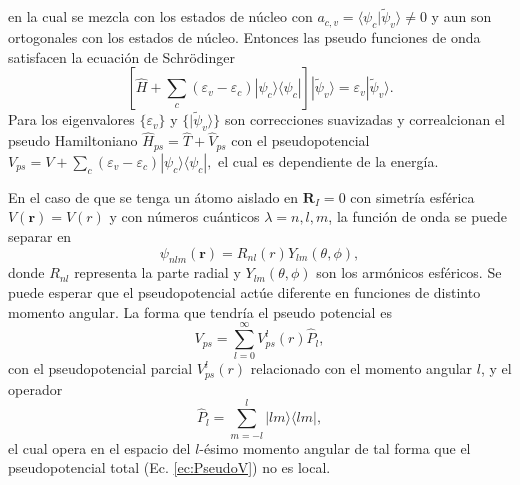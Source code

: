    en la cual se mezcla con los estados de n\'ucleo con $a_{c,v} = \langle \psi_c | \tilde{\psi}_v \rangle \not = 0$ y aun son ortogonales con los estados de n\'ucleo. Entonces las pseudo funciones de onda satisfacen la ecuaci\'on de  Schr\"odinger \cite{PhysRev.57.1169}
   \begin{equation}
   \left[\hat{H} + \sum_{c} (\varepsilon_v - \varepsilon_c) |\psi_c \rangle \langle \psi_c |\right] |\tilde{\psi}_v \rangle = \varepsilon_v | \tilde{\psi}_v \rangle .
   \end{equation}
   Para los eigenvalores $\{ \varepsilon_v \}$ y $ \{| \tilde{\psi}_v \rangle \}$ son correcciones suavizadas y correalcionan el pseudo Hamiltoniano $\hat{H}_{ps} = \hat{T} + \hat{V}_{ps}$ con el pseudopotencial
   $
   V_{ps}= V+ \sum_{c} (\varepsilon_v - \varepsilon_c) |\psi_c \rangle \langle \psi_c |,
   $
   el cual es dependiente de la energ\'ia.
   \newline
   \par En el caso de que se tenga un \'atomo aislado en $\pmb{R}_I = 0$ con simetr\'ia esf\'erica $V(\pmb{r}) = V(r)$ y con n\'umeros cu\'anticos $\lambda= n,l,m $, la funci\'on de onda se puede separar en \cite{MB-2015}
   \begin{equation}
   \psi_{nlm} (\pmb{r}) = R_{nl} (r) Y_{lm} (\theta, \phi) \label{ec:Psudofunc},
   \end{equation}
   donde $R_{nl}$ representa la parte radial y $Y_{lm} (\theta, \phi) $ son los  arm\'onicos esf\'ericos. Se puede esperar que el pseudopotencial act\'ue diferente en funciones de distinto momento angular.  La forma que tendr\'ia el pseudo potencial es \cite{PhysRev.57.1169} 
   \begin{equation}
   V_{ps} = \sum_{l=0}^{\infty} V_{ps}^l (r) \hat{P}_l \label{ec:PseudoV},
   \end{equation} 
   con el pseudopotencial parcial $V_{ps}^l (r) $ relacionado con el momento angular $l$, y el operador \cite{PhysRev.57.1169}
   \begin{equation}
   \hat{P}_l = \sum_{m=-l}^{l} |lm \rangle \langle lm | \label{ec:psudoProj},
   \end{equation}
   el cual opera en el espacio del $l$-\'esimo momento angular de tal forma que el pseudopotencial total (Ec. \ref{ec:PseudoV}) no es local.
